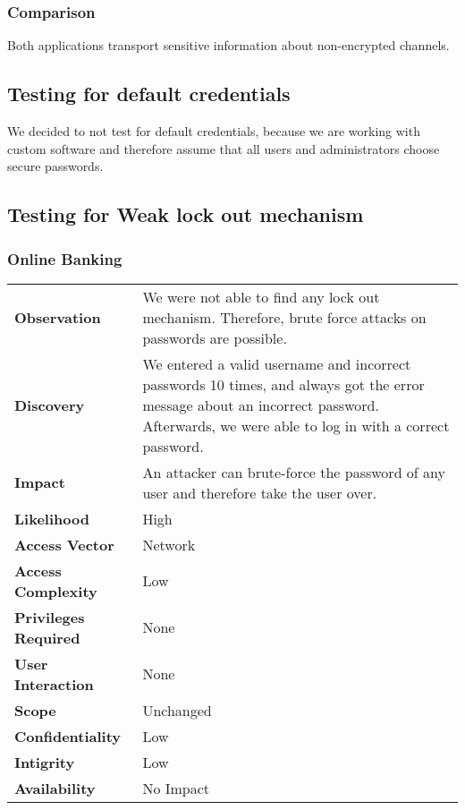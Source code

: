 \subsubsection*{Comparison}
Both applications transport sensitive information about non-encrypted channels.


\clearpage


\subsection{Testing for default credentials}
We decided to not test for default credentials, because we are working with custom software and therefore assume that all users and administrators choose secure passwords.

\clearpage


\subsection{Testing for Weak lock out mechanism}

\subsubsection*{Online Banking}

\begin{tabular}{l|p{10cm}}

\textbf{Observation} & We were not able to find any lock out mechanism. Therefore, brute force attacks on passwords are possible. \\
\textbf{Discovery} & We entered a valid username and incorrect passwords 10 times, and always got the error message about an incorrect password. Afterwards, we were able to log in with a correct password. \\
\textbf{Impact} & An attacker can brute-force the password of any user and therefore take the user over. \\
\textbf{Likelihood} & High \\
\textbf{Access Vector} & Network \\
\textbf{Access Complexity} & Low \\
\textbf{Privileges Required} & None \\
\textbf{User Interaction} & None \\
\textbf{Scope} & Unchanged \\
\textbf{Confidentiality} & Low \\
\textbf{Intigrity} & Low \\
\textbf{Availability} & No Impact \\
\end{tabular}

